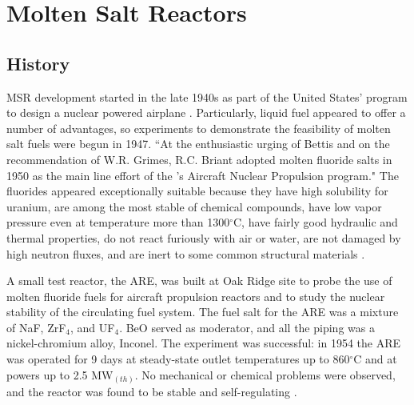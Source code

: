 \chapter[Molten Salt Reactors]{Molten Salt Reactors}

\section{History}
\gls{MSR} development started in the late 1940s as part of the United States' program to design a nuclear powered airplane \cite{bettis_aircraft_1957}. Particularly, liquid fuel appeared to offer a number of advantages, so experiments to demonstrate the feasibility of molten salt fuels were begun in 1947. ``At the enthusiastic urging of Bettis and on the recommendation of W.R. Grimes, R.C. Briant adopted molten fluoride salts in 1950 as the main line effort of the 's Aircraft Nuclear Propulsion program." The fluorides appeared exceptionally suitable because they have high solubility for uranium, are among the most stable of chemical compounds, have low vapor pressure even at temperature more than 1300$^{\circ}$C, have fairly good hydraulic and thermal properties, do not react furiously with air or water, are not damaged by high neutron fluxes, and are inert to some common structural materials \cite{rosenthal_molten-salt_1970}.

A small test reactor, the \gls{ARE}, was built at Oak Ridge site to probe the use of molten fluoride fuels for aircraft propulsion reactors and to study the nuclear stability of the circulating fuel system. The fuel salt for the \gls{ARE} was a mixture of NaF, ZrF$_4$, and UF$_4$. BeO served as moderator, and all the piping was a nickel-chromium alloy, Inconel. The experiment was successful: in 1954 the \gls{ARE} was operated for 9 days at steady-state outlet temperatures up to 860$^{\circ}$C and at powers up to 2.5 MW$_{(th)}$. No mechanical or chemical problems were observed, and the reactor was found to be stable and self-regulating \cite{bettis_aircraft_1957}.

